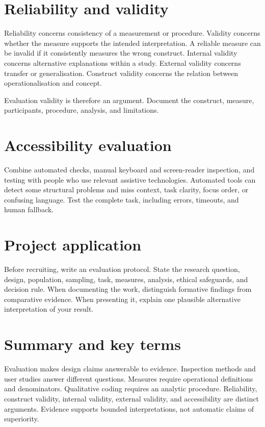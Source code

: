 \section{Reliability and validity}
Reliability concerns consistency of a measurement or procedure. Validity concerns whether the measure supports the intended interpretation. A reliable measure can be invalid if it consistently measures the wrong construct. Internal validity concerns alternative explanations within a study. External validity concerns transfer or generalisation. Construct validity concerns the relation between operationalisation and concept.

Evaluation validity is therefore an argument. Document the construct, measure, participants, procedure, analysis, and limitations.

\section{Accessibility evaluation}
Combine automated checks, manual keyboard and screen-reader inspection, and testing with people who use relevant assistive technologies. Automated tools can detect some structural problems and miss context, task clarity, focus order, or confusing language. Test the complete task, including errors, timeouts, and human fallback.

\section{Project application}
Before recruiting, write an evaluation protocol. State the research question, design, population, sampling, task, measures, analysis, ethical safeguards, and decision rule. When documenting the work, distinguish formative findings from comparative evidence. When presenting it, explain one plausible alternative interpretation of your result.

\section{Summary and key terms}
Evaluation makes design claims answerable to evidence. Inspection methods and user studies answer different questions. Measures require operational definitions and denominators. Qualitative coding requires an analytic procedure. Reliability, construct validity, internal validity, external validity, and accessibility are distinct arguments. Evidence supports bounded interpretations, not automatic claims of superiority.

